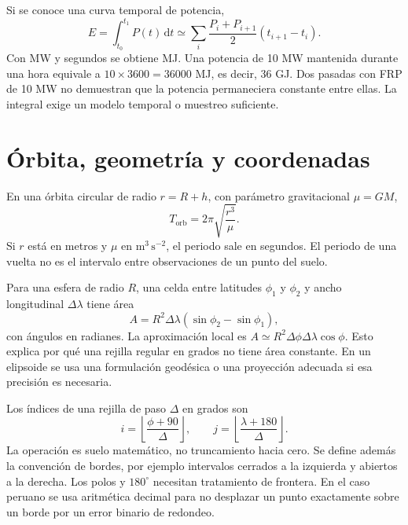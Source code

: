 Si se conoce una curva temporal de potencia,
\begin{equation}
 E=\int_{t_0}^{t_1}P(t)\,\mathrm dt
 \simeq\sum_i\frac{P_i+P_{i+1}}{2}(t_{i+1}-t_i).
\end{equation}
Con MW y segundos se obtiene MJ. Una potencia de 10 MW mantenida durante una hora
equivale a $10\times3600=36000$ MJ, es decir, 36 GJ. Dos pasadas con FRP de 10 MW no
demuestran que la potencia permaneciera constante entre ellas. La integral exige
un modelo temporal o muestreo suficiente.

\section{Órbita, geometría y coordenadas}

En una órbita circular de radio $r=R+h$, con parámetro gravitacional $\mu=GM$,
\begin{equation}
 T_{\mathrm{orb}}=2\pi\sqrt{\frac{r^3}{\mu}}.
\end{equation}
Si $r$ está en metros y $\mu$ en $\mathrm{m^3\,s^{-2}}$, el periodo sale en segundos.
El periodo de una vuelta no es el intervalo entre observaciones de un punto del suelo.

Para una esfera de radio $R$, una celda entre latitudes $\phi_1$ y $\phi_2$ y ancho
longitudinal $\Delta\lambda$ tiene área
\begin{equation}\label{eq:area-celda}
 A=R^2\Delta\lambda(\sin\phi_2-\sin\phi_1),
\end{equation}
con ángulos en radianes. La aproximación local es
$A\simeq R^2\Delta\phi\Delta\lambda\cos\phi$. Esto explica por qué una rejilla
regular en grados no tiene área constante. En un elipsoide se usa una formulación
geodésica o una proyección adecuada si esa precisión es necesaria.

Los índices de una rejilla de paso $\Delta$ en grados son
\begin{equation}
 i=\left\lfloor\frac{\phi+90}{\Delta}\right\rfloor,\qquad
 j=\left\lfloor\frac{\lambda+180}{\Delta}\right\rfloor.
\end{equation}
La operación es suelo matemático, no truncamiento hacia cero. Se define además la
convención de bordes, por ejemplo intervalos cerrados a la izquierda y abiertos a la
derecha. Los polos y $180^\circ$ necesitan tratamiento de frontera. En el caso peruano
se usa aritmética decimal para no desplazar un punto exactamente sobre un borde por
un error binario de redondeo.

